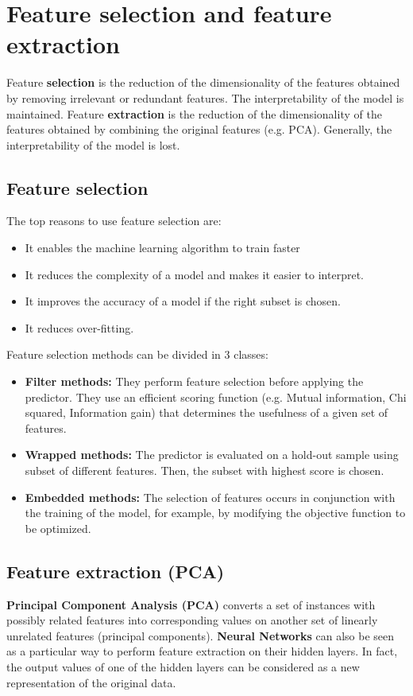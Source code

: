 \section{Feature selection and feature extraction}
Feature \textbf{selection} is the reduction of the dimensionality of the features obtained by removing irrelevant or redundant features. The interpretability of the model is maintained.\newline\newline
Feature \textbf{extraction} is the reduction of the dimensionality of the features obtained by combining the original features (e.g. PCA). Generally, the interpretability of the model is lost.

\subsection{Feature selection}
The top reasons to use feature selection are:
\begin{itemize}
    \item It enables the machine learning algorithm to train faster

    \item It reduces the complexity of a model and makes it easier to interpret.

    \item It improves the accuracy of a model if the right subset is chosen.

    \item It reduces over-fitting.
\end{itemize}
Feature selection methods can be divided in 3 classes:
\begin{itemize}
    \item \textbf{Filter methods:} They perform feature selection before applying the predictor. They use an efficient scoring function (e.g. Mutual information, Chi squared, Information gain) that determines the usefulness of a given set of features.

    \item \textbf{Wrapped methods:} The predictor is evaluated on a hold-out sample using subset of different features. Then, the subset with highest score is chosen.

    \item \textbf{Embedded methods:} The selection of features occurs in conjunction with the training of the model, for example, by modifying the objective function to be optimized. 
\end{itemize}

\subsection{Feature extraction (PCA)}
\textbf{Principal Component Analysis (PCA)} converts a set of instances with possibly related features into corresponding values on another set of linearly unrelated features (principal components).\newline\newline
\textbf{Neural Networks} can also be seen as a particular way to perform feature extraction on their hidden layers. In fact, the output values of one of the hidden layers can be considered as a new representation of the original data.

